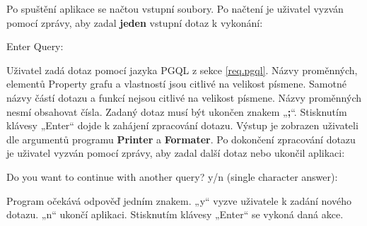 Po spuštění aplikace se načtou vstupní soubory.
Po načtení je uživatel vyzván pomocí zprávy, aby zadal \textbf{jeden} vstupní dotaz k vykonání:
\begin{code}
Enter Query:
\end{code}
Uživatel zadá dotaz pomocí jazyka PGQL z sekce \ref{req.pgql}.
Názvy proměnných, elementů Property grafu a vlastností jsou citlivé na velikost písmene.
Samotné názvy částí dotazu a funkcí nejsou citlivé na velikost písmene.
Názvy proměnných nesmí obsahovat čísla.
Zadaný dotaz musí být ukončen znakem „\textbf{;}“.
Stisknutím klávesy „Enter“ dojde k zahájení zpracování dotazu.
Výstup je zobrazen uživateli dle argumentů programu \textbf{Printer} a \textbf{Formater}.
Po dokončení zpracování dotazu je uživatel vyzván pomocí zprávy, aby zadal další dotaz nebo ukončil aplikaci:
\begin{code}
Do you want to continue with another query?
    y/n (single character answer):
\end{code}
Program očekává odpověď jedním znakem.
„y“ vyzve uživatele k zadání nového dotazu.
„n“ ukončí aplikaci.
Stisknutím klávesy „Enter“ se vykoná daná akce.
